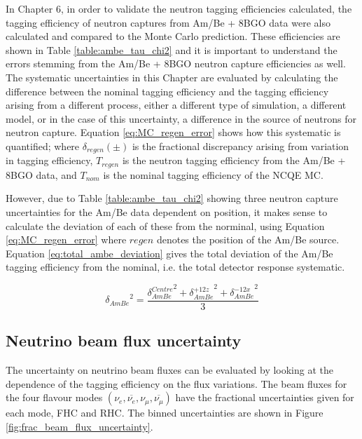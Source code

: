 In Chapter 6, in order to validate the neutron tagging efficiencies calculated, the tagging efficiency of neutron captures from Am/Be + 8BGO data were also calculated and compared to the Monte Carlo prediction. These efficiencies are shown in Table \ref{table:ambe_tau_chi2} and it is important to understand the errors stemming from the Am/Be + 8BGO neutron capture efficiencies as well. The systematic uncertainties in this Chapter are evaluated by calculating the difference between the nominal tagging efficiency and the tagging efficiency arising from a different process, either a different type of simulation, a different model, or in the case of this uncertainty, a difference in the source of neutrons for neutron capture. Equation \ref{eq:MC_regen_error} shows how this systematic is quantified; where $\delta_{regen}(\pm)$ is the fractional discrepancy arising from variation in tagging efficiency, $T_{regen}$ is the neutron tagging efficiency from the Am/Be + 8BGO data, and $T_{nom}$ is the nominal tagging efficiency of the NCQE MC. 

However, due to Table \ref{table:ambe_tau_chi2} showing three neutron capture uncertainties for the Am/Be data dependent on position, it makes sense to calculate the deviation of each of these from the norminal, using Equation \ref{eq:MC_regen_error} where $regen$ denotes the position of the Am/Be source. Equation \ref{eq:total_ambe_deviation} gives the total deviation of the Am/Be tagging efficiency from the nominal, i.e. the total detector response systematic.

\begin{equation}
    {\delta_{AmBe}}^2= \frac{{\delta_{AmBe}^{Centre}}^2 + {\delta_{AmBe}^{+12z}}^2 + {\delta_{AmBe}^{-12x}}^2}{3} 
\label{eq:total_ambe_deviation}
\end{equation}




\subsection{Neutrino beam flux uncertainty}

The uncertainty on neutrino beam fluxes can be evaluated by looking at the dependence of the tagging efficiency on the flux variations. The beam fluxes for the four flavour modes 
$\left(\nu_{e}, \overline{\nu_{e}}, \nu_{\mu}, \overline{\nu_{\mu}}\right)$ have the fractional uncertainties given for each mode, FHC and RHC. The binned uncertainties are shown in Figure \ref{fig:frac_beam_flux_uncertainty}.


